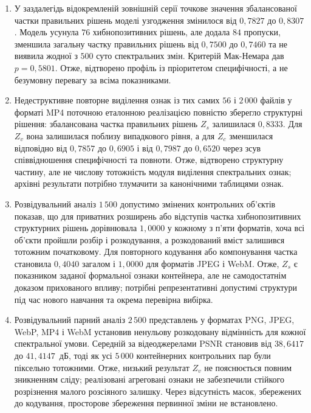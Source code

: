 \begin{enumerate}[label=\arabic*.]
\item У заздалегідь відокремленій зовнішній серії точкове значення збалансованої частки правильних рішень моделі узгодження змінилося від $0{,}7827$ до $0{,}8307$. Модель усунула $76$ хибнопозитивних рішень, але додала $84$ пропуски, зменшила загальну частку правильних рішень від $0{,}7500$ до $0{,}7460$ та не виявила жодної з $500$ суто спектральних змін. Критерій Мак-Немара дав $p=0{,}5801$. Отже, відтворено профіль із пріоритетом специфічності, а не безумовну перевагу за всіма показниками.

\item Недеструктивне повторне виділення ознак із тих самих $56$ і $2\,000$ файлів у форматі MP4 поточною еталонною реалізацією повністю зберегло структурні рішення: збалансована частка правильних рішень $Z_s$ залишилася $0{,}8333$. Для $Z_v$ вона залишилася поблизу випадкового рівня, а для $Z_c$ зменшилася відповідно від $0{,}7857$ до $0{,}6905$ і від $0{,}7987$ до $0{,}6520$ через зсув співвідношення специфічності та повноти. Отже, відтворено структурну частину, але не числову тотожність модуля виділення спектральних ознак; архівні результати потрібно тлумачити за канонічними таблицями ознак.

\item Розвідувальний аналіз $1\,500$ допустимо змінених контрольних об’єктів показав, що для приватних розширень або відступів частка хибнопозитивних структурних рішень дорівнювала $1{,}0000$ у кожному з п’яти форматів, хоча всі об’єкти пройшли розбір і розкодування, а розкодований вміст залишився тотожним початковому. Для повторного кодування або компонування частка становила $0{,}4040$ загалом і $1{,}0000$ для форматів JPEG і WebM. Отже, $Z_s$ є показником заданої формальної ознаки контейнера, але не самодостатнім доказом прихованого впливу; потрібні репрезентативні допустимі структури під час нового навчання та окрема перевірна вибірка.

\item Розвідувальний парний аналіз $2\,500$ представлень у форматах PNG, JPEG, WebP, MP4 і WebM установив ненульову розкодовану відмінність для кожної спектральної умови. Середній за відеоджерелами PSNR становив від $38{,}6417$ до $41{,}4147$~дБ, тоді як усі $5\,000$ контейнерних контрольних пар були піксельно тотожними. Отже, низький результат $Z_v$ не пояснюється повним зникненням сліду; реалізовані агреговані ознаки не забезпечили стійкого розрізнення малого розсіяного залишку. Через відсутність масок, збережених до кодування, просторове збереження первинної зміни не встановлено.


\end{enumerate}
